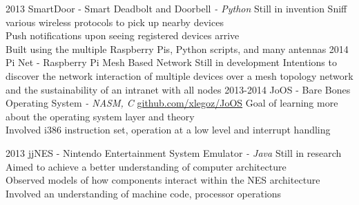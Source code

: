 \documentclass[]{friggeri-cv-short}
\begin{document}
\begin{entrylist}
  \entry
  	{2013}
  	{SmartDoor \textsf{- Smart Deadbolt and Doorbell \em{- Python}}}
  	{Still in invention}
    {Sniff various wireless protocols to pick up nearby devices \\
     Push notifications upon seeing registered devices arrive \\
  	Built using the multiple Raspberry Pis, Python scripts, and many antennas }
  \entry
  	{2014}
  	{Pi Net \textsf{- Raspberry Pi Mesh Based Network}}
  	{Still in development}
  	{Intentions to discover the network interaction of multiple devices over a mesh topology network and the sustainability of an intranet with all nodes}
  \entry
    {2013-2014}
    {JoOS \textsf{- Bare Bones Operating System \em{- NASM, C}}}
    {\href{http://github.com/xlegoz/JoOS}{github.com/xlegoz/JoOS}}
    {Goal of learning more about the operating system layer and theory \\
    Involved i386 instruction set, operation at a low level and interrupt handling}
 
  \entry
  	{2013}
  	{jjNES \textsf{- Nintendo Entertainment System Emulator \em{- Java}}}
  	{Still in research}
  	{Aimed to achieve a better understanding of computer architecture \\
  	Observed models of how components interact within the NES architecture \\
  	Involved an understanding of machine code, processor operations}
\end{entrylist}
\end{document}
